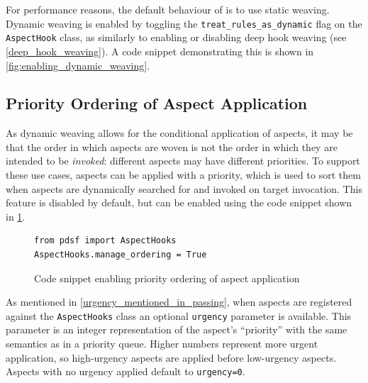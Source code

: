 For performance reasons, the default behaviour of \pdsf is to use static
weaving. Dynamic weaving is enabled by toggling the
\lstinline{treat_rules_as_dynamic} flag on the \lstinline{AspectHook} class, as
similarly to enabling or disabling deep hook weaving (see
\cref{deep_hook_weaving}). A code snippet demonstrating this is shown in
\cref{fig:enabling_dynamic_weaving}.


\subsection{Priority Ordering of Aspect Application}
\label{aspect_priority_support}

As dynamic weaving allows for the conditional application of aspects, it may be
that the order in which aspects are woven is not the order in which they are
intended to be \emph{invoked}: different aspects may have different priorities.
To support these use cases, aspects can be applied with a priority, which is
used to sort them when aspects are dynamically searched for and invoked on
target invocation. This feature is disabled by default, but can be enabled using
the code snippet shown in \cref{fig:enabling_priority_sorting_of_aspects}.

\begin{figure}[h]
    \begin{lstlisting}[style=footnotesize_python]
from pdsf import AspectHooks
AspectHooks.manage_ordering = True
    \end{lstlisting}
    \caption{Code snippet enabling priority ordering of aspect application}
    \label{fig:enabling_priority_sorting_of_aspects}
\end{figure}

As mentioned in \cref{urgency_mentioned_in_passing}, when aspects are registered
against the \lstinline{AspectHooks} class an optional \lstinline{urgency}
parameter is available. This parameter is an integer representation of the
aspect's ``priority'' with the same semantics as in a priority queue. Higher
numbers represent more urgent application, so high-urgency aspects are applied
before low-urgency aspects. Aspects with no urgency applied default to
\lstinline{urgency=0}.


